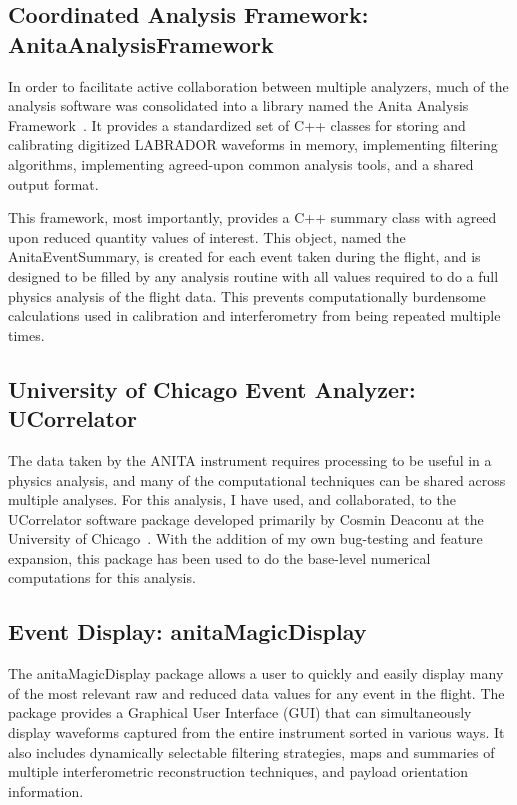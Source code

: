 	\subsection{Coordinated Analysis Framework: AnitaAnalysisFramework}
		In order to facilitate active collaboration between multiple analyzers, much of the analysis software was consolidated into a library named the Anita Analysis Framework~\cite{anitaAnalysisFramework}.  It provides a standardized set of C++ classes for storing and calibrating digitized LABRADOR waveforms in memory, implementing filtering algorithms, implementing agreed-upon common analysis tools, and a shared output format.
		
		This framework, most importantly, provides a C++ summary class with agreed upon reduced quantity values of interest.  This object, named the AnitaEventSummary, is created for each event taken during the flight, and is designed to be filled by any analysis routine with all values required to do a full physics analysis of the flight data.  This prevents computationally burdensome calculations used in calibration and interferometry from being repeated multiple times.
				
	\subsection{University of Chicago Event Analyzer: UCorrelator}
		The data taken by the ANITA instrument requires processing to be useful in a physics analysis, and many of the computational techniques can be shared across multiple analyses.  For this analysis, I have used, and collaborated, to the UCorrelator software package developed primarily by Cosmin Deaconu at the University of Chicago~\cite{UCorrelator}.  With the addition of my own bug-testing and feature expansion, this package has been used to do the base-level numerical computations for this analysis.
		
		
	\subsection{Event Display: anitaMagicDisplay}
		The anitaMagicDisplay package \cite{anitaMagicDisplay} allows a user to quickly and easily display many of the most relevant raw and reduced data values for any event in the flight.  The package provides a Graphical User Interface (GUI) that can simultaneously display waveforms captured from the entire instrument sorted in various ways.  It also includes dynamically selectable filtering strategies, maps and summaries of multiple interferometric reconstruction techniques, and payload orientation information.  
		
